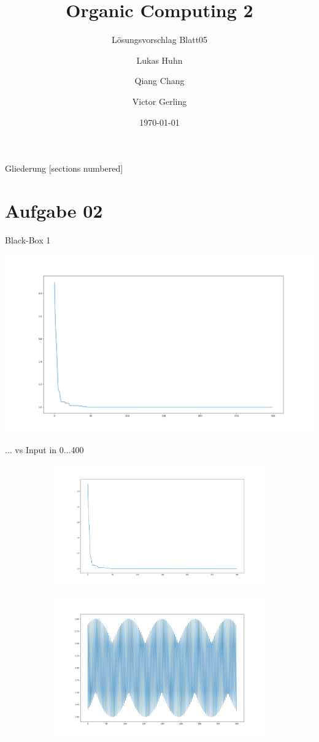 \documentclass{ocbeameruni}
\title{Organic Computing 2}
\subtitle{Lösungsvorschlag Blatt05}
\date{\today}
\author{Lukas Huhn \and Qiang Chang \and Victor Gerling}
\institute{%
  Universität Augsburg\\
  Institut für Informatik\\
  Lehrstuhl für Organic Computing
}
\begin{document}
\maketitle


\begin{frame}{Gliederung}
  [sections numbered]
  \tableofcontents
\end{frame}

\section{Aufgabe 02}

\begin{frame}{Black-Box 1}
    \begin{center}
    \includegraphics[scale=0.2]{plots/bb1_2.png}
    \end{center}
\end{frame}


\begin{frame}{... vs Input in 0...400}
\begin{figure}
\centering
\begin{subfigure}
  \centering
  \includegraphics[width=.5\linewidth]{plots/bb1_2.png}
\end{subfigure}
\begin{subfigure}
  \centering
  \includegraphics[width=.5\linewidth]{plots/bb1_distr.png}
\end{subfigure}
\end{figure}
\end{frame}
\end{document}
